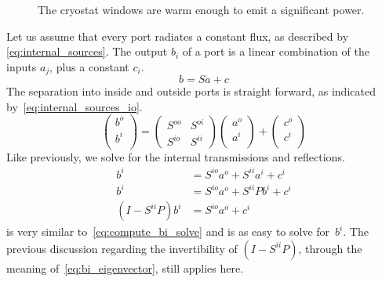 \begin{figure}[hbtp]
    \centering
    \caption{\label{fig:internal_sources_windows} The cryostat windows are warm enough to emit a significant power.}
\end{figure}

Let us assume that every port radiates a constant flux, as described by \cref{eq:internal_sources}.
The output $b_i$ of a port is a linear combination of the inputs $a_j$, plus a constant $c_i$.
\begin{equation}
    b = S a + c
    \label{eq:internal_sources}
\end{equation}
The separation into inside and outside ports is straight forward, as indicated by~\cref{eq:internal_sources_io}.
\begin{equation}
    \begin{pmatrix}
        b^o\\
        b^i\\
    \end{pmatrix}
    =
    \begin{pmatrix}
        S^{oo} & S^{oi} \\
        S^{io} & S^{ii}
    \end{pmatrix}
    \begin{pmatrix}
        a^o\\
        a^i\\
    \end{pmatrix}
    +
    \begin{pmatrix}
        c^o\\
        c^i\\
    \end{pmatrix}
    \label{eq:internal_sources_io}
\end{equation}
Like previously, we solve for the internal transmissions and reflections.
\begin{subequations}
    \begin{align}
        b^i &= S^{io} a^o + S^{ii} a^i + c^i \label{eq:compute_bi_ai_ci}\\
        b^i &= S^{io} a^o + S^{ii} Pb^i + c^i \label{eq:compute_bi_bi_ci}\\
        (I - S^{ii} P) b^i &= S^{io} a^o + c^i \label{eq:compute_bi_ci_solve}
    \end{align}
    \label{eq:compute_bi_ci}
\end{subequations}
 is very similar to~\cref{eq:compute_bi_solve} and is as easy to solve for~$b^i$.
The previous discussion regarding the invertibility of $(I - S^{ii} P)$, through the meaning of~\cref{eq:bi_eigenvector}, still applies here.

